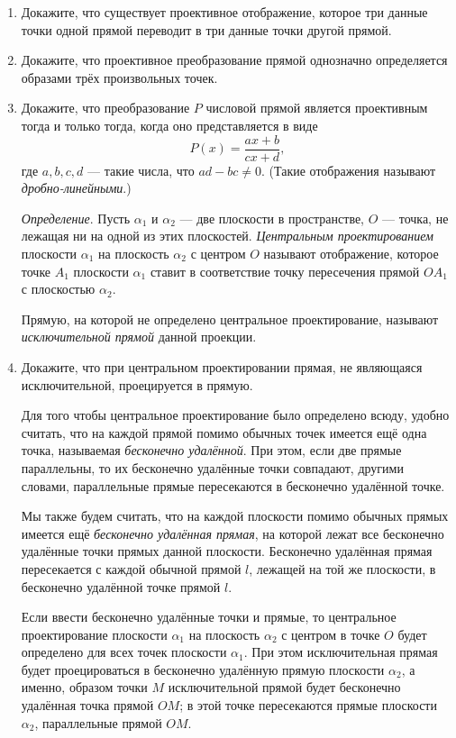 	\begin{enumerate}
		\item Докажите, что существует проективное отображение, которое три данные точки одной прямой переводит в три данные точки другой прямой.
 
		\item Докажите, что проективное преобразование прямой однозначно определяется образами трёх произвольных точек.
 
		\item Докажите, что преобразование $P$ числовой прямой является проективным тогда и только тогда, когда оно представляется в виде
		\[
			P(x) = \frac{ax + b}{cx + d},
		\]
		где $a, b, c, d$ --- такие числа, что $ad - bc \ne 0$. (Такие отображения называют \textit{дробно-линейными}.)
 
		\textit{Определение}. Пусть $\alpha_1$ и $\alpha_2$ --- две плоскости в пространстве, $O$ --- точка, не лежащая ни на одной из этих плоскостей. \textit{Центральным проектированием} плоскости $\alpha_1$ на плоскость $\alpha_2$ с центром $O$ называют отображение, которое точке $A_1$ плоскости $\alpha_1$ ставит в соответствие точку пересечения прямой $OA_1$ с плоскостью $\alpha_2$.
 
		Прямую, на которой не определено центральное проектирование, называют \textit{исключительной прямой} данной проекции.
 
		\item Докажите, что при центральном проектировании прямая, не являющаяся исключительной, проецируется в прямую.
 
		Для того чтобы центральное проектирование было определено всюду, удобно считать, что на каждой прямой помимо обычных точек имеется ещё одна точка, называемая \textit{бесконечно удалённой}. При этом, если две прямые параллельны, то их бесконечно удалённые точки совпадают, другими словами, параллельные прямые пересекаются в бесконечно удалённой точке.
 
		Мы также будем считать, что на каждой плоскости помимо обычных прямых имеется ещё \textit{бесконечно удалённая прямая}, на которой лежат все бесконечно удалённые точки прямых данной плоскости. Бесконечно удалённая прямая пересекается с каждой обычной прямой $l$, лежащей на той же плоскости, в бесконечно удалённой точке прямой $l$.
 
		Если ввести бесконечно удалённые точки и прямые, то центральное проектирование плоскости $\alpha_1$ на плоскость $\alpha_2$ с центром в точке $O$ будет определено для всех точек плоскости $\alpha_1$. При этом исключительная прямая будет проецироваться в бесконечно удалённую прямую плоскости $\alpha_2$, а именно, образом точки $M$ исключительной прямой будет бесконечно удалённая точка прямой $OM$; в этой точке пересекаются прямые плоскости $\alpha_2$, параллельные прямой $OM$.
 

\end{enumerate}
